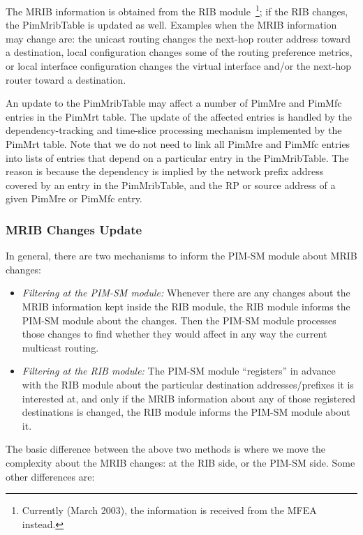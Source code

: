 \documentclass[11pt]{article}
\begin{document}
The MRIB information is obtained from the RIB
module~\footnote{Currently (March 2003), the information is
received from the MFEA instead.}; if the RIB changes, the
PimMribTable is updated as well. Examples when the MRIB information
may change are: the unicast routing changes the next-hop router address
toward a destination, local configuration changes some of the routing
preference metrics, or local interface configuration changes the virtual
interface and/or the next-hop router toward a destination.

An update to the PimMribTable may affect a number of PimMre and PimMfc
entries in the PimMrt table. The update of the affected entries is
handled by the dependency-tracking and time-slice processing mechanism
implemented by the PimMrt table. Note that we do not need to link all
PimMre and PimMfc entries into lists of entries that depend on a
particular entry in the PimMribTable. The reason is because the
dependency is implied by the network prefix address covered by an entry
in the PimMribTable, and the RP or source address of a given PimMre or
PimMfc entry.

\subsubsection{MRIB Changes Update}

In general, there are two mechanisms to inform the PIM-SM module about
MRIB changes:

\begin{itemize}
  \item \emph{Filtering at the PIM-SM module:}
  Whenever there are any changes about the MRIB information kept inside
  the RIB module, the RIB module informs the PIM-SM module
  about the changes. Then the PIM-SM module processes those changes to
  find whether they would affect in any way the current multicast
  routing.

  \item \emph{Filtering at the RIB module:}
  The PIM-SM module ``registers'' in advance with the RIB module about
  the particular destination addresses/prefixes it is interested at, and
  only if the MRIB information about any of those registered destinations
  is changed, the RIB module informs the PIM-SM module about it.

\end{itemize}

The basic difference between the above two methods is where we move the
complexity about the MRIB changes: at the RIB side, or the PIM-SM side.
Some other differences are:
\end{document}
